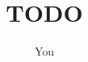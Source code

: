 \documentclass{article}
\begin{document}
\title{TODO}
\author{You}
\maketitle
\tableofcontents
\end{document}
